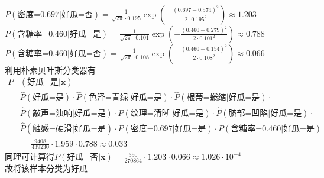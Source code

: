 \documentclass[12pt, a4paper, oneside]{ctexart}
\begin{document}
\\ $P(\mbox{密度=0.697|好瓜=否})=\frac{1}{\sqrt{2\pi}\cdot 0.195}\exp(-\frac{(0.697-0.574)^2}{2\cdot {0.195}^2})\approx 1.203$
\\ $P(\mbox{含糖率=0.460|好瓜=是})=\frac{1}{\sqrt{2\pi}\cdot 0.101}\exp(-\frac{(0.460-0.279)^2}{2\cdot {0.101}^2})\approx 0.788$
\\ $P(\mbox{含糖率=0.460|好瓜=否})=\frac{1}{\sqrt{2\pi}\cdot 0.108}\exp(-\frac{(0.460-0.154)^2}{2\cdot {0.108}^2})\approx 0.066$
\\ 利用朴素贝叶斯分类器有
\begin{equation}
    \begin{aligned}
        P & (\mbox{好瓜=是}|\boldsymbol{x})= \\
        & \widehat{P}(\mbox{好瓜=是})\cdot\widehat{P}(\mbox{色泽=青绿|好瓜=是})\cdot\widehat{P}(\mbox{根蒂=蜷缩|好瓜=是})\cdot \\
        & \widehat{P}(\mbox{敲声=浊响|好瓜=是})\cdot\widehat{P}(\mbox{纹理=清晰|好瓜=是})\cdot \widehat{P}(\mbox{脐部=凹陷|好瓜=是})\cdot \\
        & \widehat{P}(\mbox{触感=硬滑|好瓜=是})\cdot P(\mbox{密度=0.697|好瓜=是}) \cdot P(\mbox{含糖率=0.460|好瓜=是}) \\
        & =\frac{9408}{439230}\cdot 1.959 \cdot 0.788 \approx 0.033
    \end{aligned}
    \nonumber
\end{equation}
同理可计算得$P(\mbox{好瓜=否}|\boldsymbol{x})=\frac{350}{270864}\cdot 1.203 \cdot 0.066 \approx 1.026\cdot 10^{-4}$
\\ 故将该样本分类为好瓜
\end{document}
